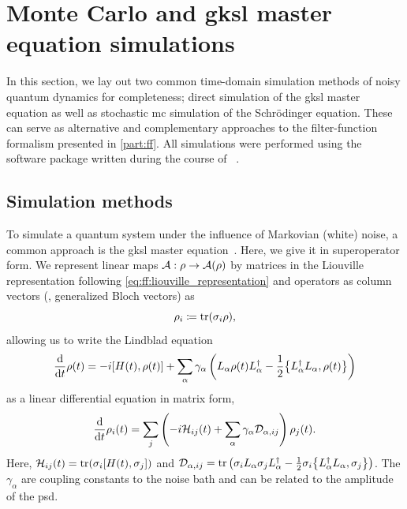 \section{Monte Carlo and \texorpdfstring{\acrshort{gksl}}{GKSL} master equation simulations}\label{sec:app:ff:time_domain_methods}
In this section, we lay out two common time-domain simulation methods of noisy quantum dynamics for completeness; direct simulation of the \gls{gksl} master equation as well as stochastic \gls{mc} simulation of the Schrödinger equation.
These can serve as alternative and complementary approaches to the filter-function formalism presented in \cref{part:ff}.
All simulations were performed using the  software package written during the course of \thethesis~\cite{Hangleiter_lmt}.

\subsection{Simulation methods}\label{subsec:app:ff:time_domain_methods:methods}
To simulate a quantum system under the influence of Markovian (white) noise, a common approach is the \gls{gksl} master equation~\cite{Lindblad1976,Gorini1976}.
Here, we give it in superoperator form.
We represent linear maps $\mathcal{A}: \rho\rightarrow\mathcal{A}(\rho)$ by matrices in the Liouville representation following \cref{eq:ff:liouville_representation}
and operators as column vectors (\ie, generalized Bloch vectors) as
\begin{equation}\label{eq:app:ff:bloch_vector}
    \rho_i \coloneqq \tr(\sigma_i\rho),
\end{equation}
allowing us to write the Lindblad equation
\begin{equation}\label{eq:app:ff:lindblad:hilbert}
    \dv{t}\rho(t) = -\i\comm{H(t)}{\rho(t)} + \sum_\alpha \gamma_\alpha\left(L_\alpha\rho(t) L_\alpha\adjoint - \frac{1}{2}\acomm{L_\alpha\adjoint L_\alpha}{\rho(t)}\right)
\end{equation}
as a linear differential equation in matrix form,
\begin{equation}\label{eq:app:ff:lindlbad:liouville}
    \dv{t}\rho_i(t) = \sum_j\left(-i\mathcal{H}_{ij}(t)+ \sum_\alpha \gamma_\alpha \mathcal{D}_{\alpha, ij}\right)\rho_j(t).
\end{equation}
Here, $\mc{H}_{ij}(t) = \tr(\sigma_i\comm{H(t)}{\sigma_j})$ and $\mc{D}_{\alpha, ij} = \tr\left(\sigma_i L_\alpha\sigma_j L_\alpha\adjoint - \frac{1}{2}\sigma_i \acomm{L_\alpha\adjoint L_\alpha}{\sigma_j}\right)$.
The $\gamma_\alpha$ are coupling constants to the noise bath and can be related to the amplitude of the \gls{psd}.
